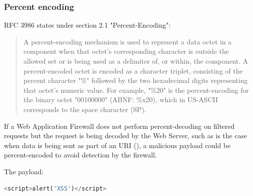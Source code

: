 

\subsubsection{Percent encoding}
RFC 3986 states under section 2.1 "Percent-Encoding":
\begin{quote}
	A percent-encoding mechanism is used to represent a data octet in a
	component when that octet's corresponding character is outside the
	allowed set or is being used as a delimiter of, or within, the
	component.  A percent-encoded octet is encoded as a character
	triplet, consisting of the percent character "\%" followed by the two
	hexadecimal digits representing that octet's numeric value.  For
	example, "\%20" is the percent-encoding for the binary octet
	"00100000" (ABNF: \%x20), which in US-ASCII corresponds to the space
	character (SP). \cite{rfc3986}
\end{quote}
If a Web Application Firewall does not perform percent-decoding on filtered requests but the request is being decoded by the Web Server, such as is the case when data is being sent as part of an URI (\cite{rfc3986/sec2.4}), a malicious payload could be percent-encoded to avoid detection by the firewall.

The payload:

\begin{lstlisting}[style=basicStyle, language=Python]
<script>alert('XSS')</script>
\end{lstlisting}

